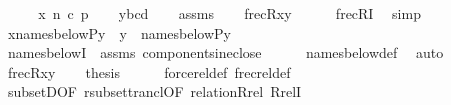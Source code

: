 \begin{isabellebody}
%
\isadelimproof
%
\endisadelimproof
%
\isatagproof
{}\isamarkupfalse%
\ {\isacharminus}{\kern0pt}\isanewline
\ \ \isamarkupfalse%
\ {\isacharquery}{\kern0pt}x{\isacharequal}{\kern0pt}{\isachardoublequoteopen}{\isasymlangle}{}{\isacharcomma}{\kern0pt}\ n{}{\isacharcomma}{\kern0pt}\ c{\isacharcomma}{\kern0pt}\ p{\isasymrangle}{\isachardoublequoteclose}\isanewline
\ \ \isamarkupfalse%
\ {\isacharquery}{\kern0pt}y{\isacharequal}{\kern0pt}{\isachardoublequoteopen}{\isasymlangle}{}{\isacharcomma}{\kern0pt}b{\isacharcomma}{\kern0pt}c{\isacharcomma}{\kern0pt}d{\isasymrangle}{\isachardoublequoteclose}\isanewline
\ \ \isamarkupfalse%
\ assms\isanewline
\ \ \isamarkupfalse%
\ {\isachardoublequoteopen}frecR{\isacharparenleft}{\kern0pt}{\isacharquery}{\kern0pt}x{\isacharcomma}{\kern0pt}{\isacharquery}{\kern0pt}y{\isacharparenright}{\kern0pt}{\isachardoublequoteclose}\isanewline
\ \ \ \ \isamarkupfalse%
\ frecRI{}\ \isamarkupfalse%
\ simp\isanewline
\ \ \isamarkupfalse%
\isanewline
\ \ \isamarkupfalse%
\ {\isachardoublequoteopen}{\isacharquery}{\kern0pt}x{\isasymin}names{\isacharunderscore}{\kern0pt}below{\isacharparenleft}{\kern0pt}P{\isacharcomma}{\kern0pt}{\isacharquery}{\kern0pt}y{\isacharparenright}{\kern0pt}{\isachardoublequoteclose}\ \ {\isachardoublequoteopen}{\isacharquery}{\kern0pt}y\ {\isasymin}\ names{\isacharunderscore}{\kern0pt}below{\isacharparenleft}{\kern0pt}P{\isacharcomma}{\kern0pt}{\isacharquery}{\kern0pt}y{\isacharparenright}{\kern0pt}{\isachardoublequoteclose}\isanewline
\ \ \ \ \isamarkupfalse%
\ names{\isacharunderscore}{\kern0pt}belowI\ \ assms\ components{\isacharunderscore}{\kern0pt}in{\isacharunderscore}{\kern0pt}eclose\isanewline
\ \ \ \ \isamarkupfalse%
\ names{\isacharunderscore}{\kern0pt}below{\isacharunderscore}{\kern0pt}def\ \isamarkupfalse%
\ auto\isanewline
\ \ \isamarkupfalse%
\ {\isacartoucheopen}frecR{\isacharparenleft}{\kern0pt}{\isacharquery}{\kern0pt}x{\isacharcomma}{\kern0pt}{\isacharquery}{\kern0pt}y{\isacharparenright}{\kern0pt}{\isacartoucheclose}\isanewline
\ \ \isamarkupfalse%
\ {\isacharquery}{\kern0pt}thesis\isanewline
\ \ \ \ \isamarkupfalse%
\ forcerel{\isacharunderscore}{\kern0pt}def\ frecrel{\isacharunderscore}{\kern0pt}def\isanewline
\ \ \ \ \isamarkupfalse%
\ subsetD{\isacharbrackleft}{\kern0pt}OF\ r{\isacharunderscore}{\kern0pt}subset{\isacharunderscore}{\kern0pt}trancl{\isacharbrackleft}{\kern0pt}OF\ relation{\isacharunderscore}{\kern0pt}Rrel{\isacharbrackright}{\kern0pt}{\isacharbrackright}{\kern0pt}\ RrelI\isanewline

\end{isabellebody}
